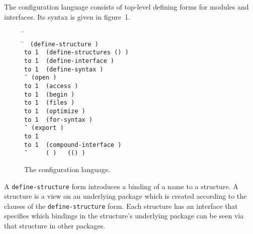 The configuration language consists of top-level defining forms for
modules and interfaces.  Its syntax is given in figure~1.

\hbox{\goesto}
\newcommand{\altz}{\hbox to 1\wd0{\hfil\alt}}


\begin{figure}
\begin{tabbing}
    \=\goesto{}~ \\
    \=\goesto{}~
      \tt(define-structure  
          ) \\
        \>\altz{}~ \tt(define-structures ()
          ) \\
        \>\altz{}~ \tt(define-interface  ) \\
        \>\altz{}~ \tt(define-syntax  ) \\
    \=\goesto{}~ \tt(open ) \\
        \>\altz{}~ \tt(access ) \\
        \>\altz{}~ \tt(begin ) \\
        \>\altz{}~ \tt(files ) \\
        \>\altz{}~ \tt(optimize ) \\
        \>\altz{}~ \tt(for-syntax ) \\
    \=\goesto{}~ \tt(export ) \\
        \>\altz{}~  \\
        \>\altz{}~ \tt(compound-interface ) \\
    \=\goesto{}~ ~ 
          \alt{}~ \tt( )
          \alt{}~ \tt(() )
\end{tabbing}
\caption{The configuration language.}
\end{figure}


A {\tt define-structure} form introduces a binding of a name to a
structure.  A structure is a view on an underlying package which is
created according to the clauses of the {\tt define-structure} form.
Each structure has an interface that specifies which bindings in the
structure's underlying package can be seen via that structure in other
packages.

